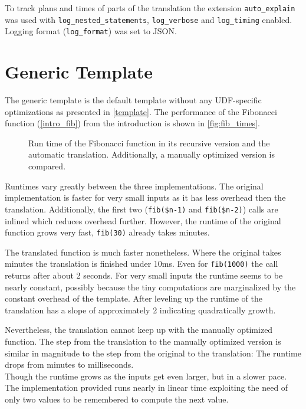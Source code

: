 To track plans and times of parts of the translation the extension \texttt{auto\_explain} was used with \texttt{log\_nested\_statements}, \texttt{log\_verbose} and \texttt{log\_timing} enabled. Logging format (\texttt{log\_format}) was set to JSON.

\section{Generic Template}

The generic template is the default template without any UDF-specific optimizations as presented in \autoref{template}. The performance of the Fibonacci function (\autoref{intro_fib}) from the introduction is shown in \autoref{fig:fib_times}.

\begin{figure}[h!]
    \centering\small
    
    \caption{Run time of the Fibonacci function in its recursive version and the automatic translation. Additionally, a manually optimized version is compared.}
    \label{fig:fib_times}
\end{figure}

Runtimes vary greatly between the three implementations. The original implementation is faster for very small inputs as it has less overhead then the translation. Additionally, the first two (\texttt{fib(\$n-1)} and \texttt{fib(\$n-2)}) calls are inlined which reduces overhead further. However, the runtime of the original function grows very fast, \texttt{fib(30)} already takes minutes.

The translated function is much faster nonetheless. Where the original takes minutes the translation is finished under 10ms. Even for \texttt{fib(1000)} the call returns after about 2 seconds. For very small inputs the runtime seems to be nearly constant, possibly because the tiny computations are marginalized by the constant overhead of the template. After leveling up the runtime of the translation has a slope of approximately 2 indicating quadratically growth.

Nevertheless, the translation cannot keep up with the manually optimized function. The step from the translation to the manually optimized version is similar in magnitude to the step from the original to the translation: The runtime drops from minutes to milliseconds.\\
Though the runtime grows as the inputs get even larger, but in a slower pace. The implementation provided runs nearly in linear time exploiting the need of only two values to be remembered to compute the next value.\\

